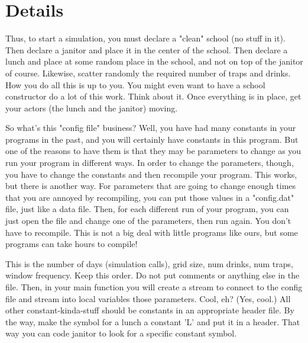 \documentclass[
    subject = {{Comp Sci}},
    course = {{1570}},
    section = {{101}},
    assignment = {{Assignment 10 \\ Final Project}},
    name = {{Student One ; Student Two}},
    email = {{stosid@mst.edu ; sttsid@mst.edu}}
]{eey-homework}
\begin{document}
\section{Details}
Thus, to start a simulation, you must declare a "clean" school (no stuff in it).
Then declare a janitor and place it in the center of the school.
Then declare a lunch and place at some random place in the school, and not on top of the janitor of course.
Likewise, scatter  randomly the required number of traps and drinks.
How you do all this is up to you.
You might even want to have a school constructor do a lot of this work.
Think about it.
Once everything is in place, get your actors (the lunch and the janitor) moving.\hfill\break

So what's this "config file" business? Well, you have had many constants in your programs in the past, and you will certainly have constants in this program.
But one of the reasons to have them is that they may be parameters to change as you run your program in different ways.
In order to change the parameters, though, you have to change the constants and then recompile your program.
This works, but there is another way.
For parameters that are going to change enough times that you are annoyed by recompiling, you can put those values in a "config.dat" file, just like a data file.
Then, for each different run of your program, you can just open the file and change one of the parameters, then run again.
You don't have to recompile.
This is not a big deal with little programs like ours, but some programs can take hours to compile!\hfill\break

This is the number of days (simulation calls), grid size, num drinks, num traps, window frequency.
Keep this order.
Do not put comments or anything else in the file.
Then, in your main function you will create a stream to connect to the config file and stream into local variables those parameters.
Cool, eh? (Yes, cool.)
All other constant-kinda-stuff should be constants in an appropriate header file. By the way, make the symbol for a lunch a constant 'L' and put it in a header.
That way you can code janitor to look for a specific constant symbol.
\end{document}
